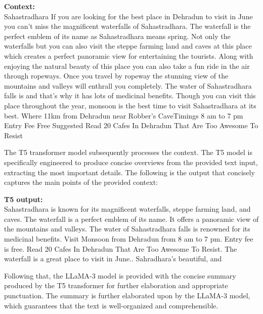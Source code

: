 \documentclass[conference]{IEEEtran}
\begin{document}
\begin{mdframed}[linewidth=1pt, innerleftmargin=15pt, innerrightmargin=15pt, innertopmargin=15pt, innerbottommargin=15pt]
\textbf{Context:} \\
\small
Sahastradhara If you are looking for the best place in Dehradun to visit in June you can't miss the magnificent waterfalls of Sahastradhara. The waterfall is the perfect emblem of its name as Sahastradhara means spring. Not only the waterfalls but you can also visit the steppe farming land and caves at this place which creates a perfect panoramic view for entertaining the tourists. Along with enjoying the natural beauty of this place you can also take a fun ride in the air through ropeways. Once you travel by ropeway the stunning view of the mountains and valleys will enthrall you completely. The water of Sahastradhara falls is and that’s why it has lots of medicinal benefits. Though you can visit this place throughout the year, monsoon is the best time to visit Sahastradhara at its best. Where 11km from Dehradun near Robber's CaveTimings 8 am to 7 pm Entry Fee Free Suggested Read 20 Cafes In Dehradun That Are Too Awesome To Resist
\end{mdframed}

The T5 transformer model subsequently processes the context. The T5 model is specifically engineered to produce concise overviews from the provided text input, extracting the most important details. The following is the output that concisely captures the main points of the provided context:

\begin{mdframed}[linewidth=1pt, innerleftmargin=15pt, innerrightmargin=15pt, innertopmargin=15pt, innerbottommargin=15pt]
\textbf{T5 output:} \\
\small
Sahastradhara is known for its magnificent waterfalls, steppe farming land, and caves. The waterfall is a perfect emblem of its name. It offers a panoramic view of the mountains and valleys. The water of Sahastradhara falls is renowned for its medicinal benefits. Visit Monsoon from Dehradun from 8 am to 7 pm. Entry fee is free. Read 20 Cafes In Dehradun That Are Too Awesome To Resist. The waterfall is a great place to visit in June.. Sahradhara's beautiful, and
\end{mdframed}

Following that, the LLaMA-3 model is provided with the concise summary produced by the T5 transformer for further elaboration and appropriate punctuation. The summary is further elaborated upon by the LLaMA-3 model, which guarantees that the text is well-organized and comprehensible.
\end{document}
